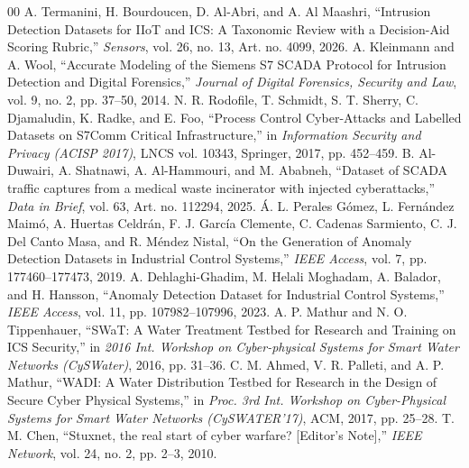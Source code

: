 \documentclass[conference]{IEEEtran}
\begin{document}
\begin{thebibliography}{00}
 A. Termanini, H. Bourdoucen, D. Al-Abri, and A. Al Maashri, ``Intrusion Detection Datasets for IIoT and ICS: A Taxonomic Review with a Decision-Aid Scoring Rubric,'' \emph{Sensors}, vol. 26, no. 13, Art. no. 4099, 2026.
 A. Kleinmann and A. Wool, ``Accurate Modeling of the Siemens S7 SCADA Protocol for Intrusion Detection and Digital Forensics,'' \emph{Journal of Digital Forensics, Security and Law}, vol. 9, no. 2, pp. 37--50, 2014.
 N. R. Rodofile, T. Schmidt, S. T. Sherry, C. Djamaludin, K. Radke, and E. Foo, ``Process Control Cyber-Attacks and Labelled Datasets on S7Comm Critical Infrastructure,'' in \emph{Information Security and Privacy (ACISP 2017)}, LNCS vol. 10343, Springer, 2017, pp. 452--459.
 B. Al-Duwairi, A. Shatnawi, A. Al-Hammouri, and M. Ababneh, ``Dataset of SCADA traffic captures from a medical waste incinerator with injected cyberattacks,'' \emph{Data in Brief}, vol. 63, Art. no. 112294, 2025.
 \'A. L. Perales G\'omez, L. Fern\'andez Maim\'o, A. Huertas Celdr\'an, F. J. Garc\'ia Clemente, C. Cadenas Sarmiento, C. J. Del Canto Masa, and R. M\'endez Nistal, ``On the Generation of Anomaly Detection Datasets in Industrial Control Systems,'' \emph{IEEE Access}, vol. 7, pp. 177460--177473, 2019.
 A. Dehlaghi-Ghadim, M. Helali Moghadam, A. Balador, and H. Hansson, ``Anomaly Detection Dataset for Industrial Control Systems,'' \emph{IEEE Access}, vol. 11, pp. 107982--107996, 2023.
 A. P. Mathur and N. O. Tippenhauer, ``SWaT: A Water Treatment Testbed for Research and Training on ICS Security,'' in \emph{2016 Int. Workshop on Cyber-physical Systems for Smart Water Networks (CySWater)}, 2016, pp. 31--36.
 C. M. Ahmed, V. R. Palleti, and A. P. Mathur, ``WADI: A Water Distribution Testbed for Research in the Design of Secure Cyber Physical Systems,'' in \emph{Proc. 3rd Int. Workshop on Cyber-Physical Systems for Smart Water Networks (CySWATER'17)}, ACM, 2017, pp. 25--28.
 T. M. Chen, ``Stuxnet, the real start of cyber warfare? [Editor's Note],'' \emph{IEEE Network}, vol. 24, no. 2, pp. 2--3, 2010.
\end{thebibliography}
\end{document}
